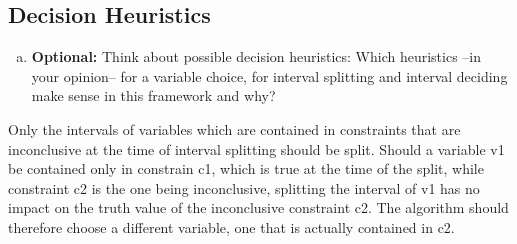 
\subsection{Decision Heuristics}

\begin{enumerate}[(e)]
    \item \textbf{Optional:} Think about possible decision heuristics: Which heuristics –in your opinion– for a variable choice, for interval splitting and interval deciding make sense in this framework and why?
\end{enumerate}

Only the intervals of variables which are contained in constraints that are inconclusive at the time of interval splitting should be split. Should a variable v1 be contained only in constrain c1, which is true at the time of the split, while constraint c2 is the one being inconclusive, splitting the interval of v1 has no impact on the truth value of the inconclusive constraint c2. The algorithm should therefore choose a different variable, one that is actually contained in c2.
